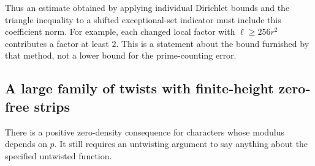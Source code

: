 \documentclass[11pt]{article}
\theoremstyle{definition}
\theoremstyle{remark}
\begin{document}
Thus an estimate obtained by applying individual Dirichlet bounds
and the triangle inequality to a shifted exceptional-set indicator
must include this coefficient norm. For example, each changed
local factor with \(\ell\geq256r^2\) contributes a factor at least
\(2\). This is a statement about the bound furnished by that method,
not a lower bound for the prime-counting error.

\subsection{A large family of twists with finite-height zero-free strips}

There is a positive zero-density consequence for characters whose
modulus depends on \(p\). It still requires an untwisting argument
to say anything about the specified untwisted function.
\end{document}

